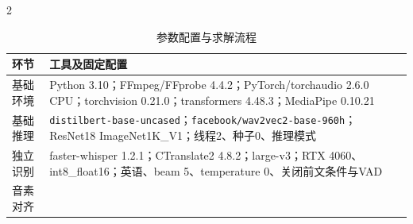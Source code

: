 \begin{PaperTable}{2}

\begin{table}[!htbp]
\centering\caption{参数配置与求解流程}
\begin{tabular}{@{}ll@{}}
\toprule
\begin{minipage}[b]{\dimexpr 0.150000\linewidth-0.300000\tabcolsep\relax}\raggedright
环节\strut
\end{minipage} & \begin{minipage}[b]{\dimexpr 0.850000\linewidth-1.700000\tabcolsep\relax}\raggedright
工具及固定配置\strut
\end{minipage}\tabularnewline
\midrule

\begin{minipage}[t]{\dimexpr 0.150000\linewidth-0.300000\tabcolsep\relax}\raggedright
基础环境\strut
\end{minipage} & \begin{minipage}[t]{\dimexpr 0.850000\linewidth-1.700000\tabcolsep\relax}\raggedright
Python 3.10；FFmpeg/FFprobe 4.4.2；PyTorch/torchaudio 2.6.0 CPU；torchvision 0.21.0；transformers 4.48.3；MediaPipe 0.10.21\strut
\end{minipage}\tabularnewline
\begin{minipage}[t]{\dimexpr 0.150000\linewidth-0.300000\tabcolsep\relax}\raggedright
基础推理\strut
\end{minipage} & \begin{minipage}[t]{\dimexpr 0.850000\linewidth-1.700000\tabcolsep\relax}\raggedright
\texttt{distilbe\allowbreak{}rt-\allowbreak{}base-\allowbreak{}uncased}；\texttt{facebook\allowbreak{}/\allowbreak{}wav2vec2\allowbreak{}-\allowbreak{}base-\allowbreak{}960h}；ResNet18 ImageNet1K\_V1；线程2、种子0、推理模式\strut
\end{minipage}\tabularnewline
\begin{minipage}[t]{\dimexpr 0.150000\linewidth-0.300000\tabcolsep\relax}\raggedright
独立识别\strut
\end{minipage} & \begin{minipage}[t]{\dimexpr 0.850000\linewidth-1.700000\tabcolsep\relax}\raggedright
faster-whisper 1.2.1；CTranslate2 4.8.2；large-v3；RTX 4060、int8\_float16；英语、beam 5、temperature 0、关闭前文条件与VAD\strut
\end{minipage}\tabularnewline
\begin{minipage}[t]{\dimexpr 0.150000\linewidth-0.300000\tabcolsep\relax}\raggedright
音素对齐\strut
\end{minipage} & \begin{minipage}[t]{\dimexpr 0.850000\linewidth-1.700000\tabcolsep\relax}\raggedright

\end{minipage}
\end{tabular}
\end{table}
\end{PaperTable}
